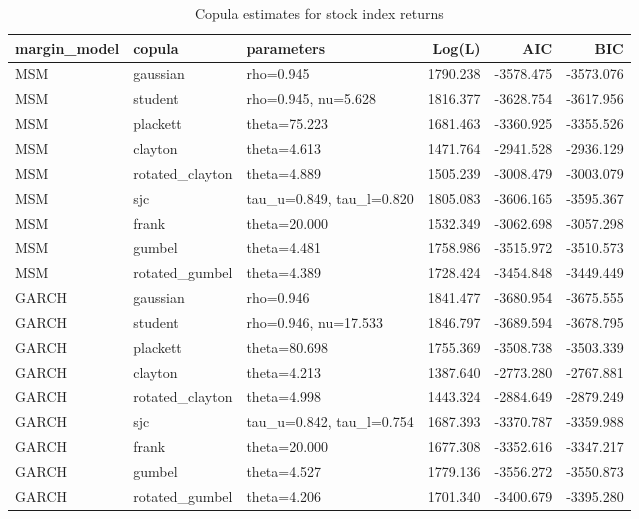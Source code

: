 \begin{table}
\caption{Copula estimates for stock index returns}
\label{tab:copula_estimates}
\begin{tabular}{lllrrr}
\toprule
margin_model & copula & parameters & Log(L) & AIC & BIC \\
\midrule
MSM & gaussian & rho=0.945 & 1790.238 & -3578.475 & -3573.076 \\
MSM & student & rho=0.945, nu=5.628 & 1816.377 & -3628.754 & -3617.956 \\
MSM & plackett & theta=75.223 & 1681.463 & -3360.925 & -3355.526 \\
MSM & clayton & theta=4.613 & 1471.764 & -2941.528 & -2936.129 \\
MSM & rotated_clayton & theta=4.889 & 1505.239 & -3008.479 & -3003.079 \\
MSM & sjc & tau_u=0.849, tau_l=0.820 & 1805.083 & -3606.165 & -3595.367 \\
MSM & frank & theta=20.000 & 1532.349 & -3062.698 & -3057.298 \\
MSM & gumbel & theta=4.481 & 1758.986 & -3515.972 & -3510.573 \\
MSM & rotated_gumbel & theta=4.389 & 1728.424 & -3454.848 & -3449.449 \\
GARCH & gaussian & rho=0.946 & 1841.477 & -3680.954 & -3675.555 \\
GARCH & student & rho=0.946, nu=17.533 & 1846.797 & -3689.594 & -3678.795 \\
GARCH & plackett & theta=80.698 & 1755.369 & -3508.738 & -3503.339 \\
GARCH & clayton & theta=4.213 & 1387.640 & -2773.280 & -2767.881 \\
GARCH & rotated_clayton & theta=4.998 & 1443.324 & -2884.649 & -2879.249 \\
GARCH & sjc & tau_u=0.842, tau_l=0.754 & 1687.393 & -3370.787 & -3359.988 \\
GARCH & frank & theta=20.000 & 1677.308 & -3352.616 & -3347.217 \\
GARCH & gumbel & theta=4.527 & 1779.136 & -3556.272 & -3550.873 \\
GARCH & rotated_gumbel & theta=4.206 & 1701.340 & -3400.679 & -3395.280 \\
\bottomrule
\end{tabular}
\end{table}
